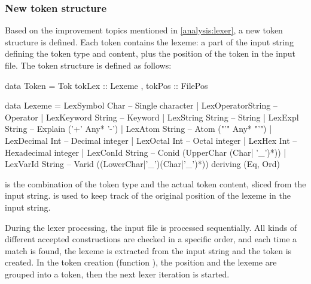 \subsubsection{New token structure}
Based on the improvement topics mentioned in \autoref{analysis:lexer}, a new token structure is defined.
Each token contains the lexeme: a part of the input string defining the token type and content, plus the position of the token in the input file.
The token structure is defined as follows:

\begin{haskell}
data Token = Tok { tokLex :: Lexeme
                 , tokPos :: FilePos
                 }
                        
data Lexeme = LexSymbol    Char       -- Single character
            | LexOperatorString  -- Operator
            | LexKeyword String  -- Keyword
            | LexString  String  -- String
            | LexExpl    String  -- Explain ('{+' Any* '-}')
            | LexAtom    String  -- Atom    ("'" Any* "'")
            | LexDecimal Int     -- Decimal integer
            | LexOctal   Int     -- Octal integer
            | LexHex     Int     -- Hexadecimal integer
            | LexConId   String  -- Conid (UpperChar (Char| '_')*))
            | LexVarId   String  -- Varid ((LowerChar|'_')(Char|'_')*))
  deriving (Eq, Ord)
\end{haskell}
%
 is the combination of the token type and the actual token content, sliced from the input string.
 is used to keep track of the original position of the lexeme in the input string.

During the lexer processing, the input file is processed sequentially.
All kinds of different accepted constructions are checked in a specific order, and each time a match is found, the lexeme is extracted from the input string and the token is created.
In the token creation (function ), the position and the lexeme are grouped into a token, then the next lexer iteration is started.
